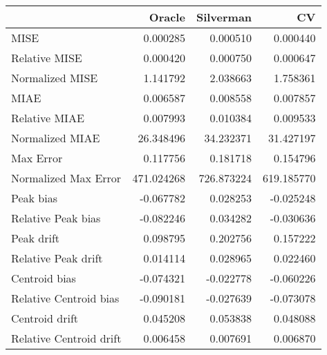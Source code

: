 \begin{tabular}{lrrr}
  \hline
 & Oracle & Silverman & CV \\ 
  \hline
MISE & 0.000285 & 0.000510 & 0.000440 \\ 
  Relative MISE & 0.000420 & 0.000750 & 0.000647 \\ 
  Normalized MISE & 1.141792 & 2.038663 & 1.758361 \\ 
  MIAE & 0.006587 & 0.008558 & 0.007857 \\ 
  Relative MIAE & 0.007993 & 0.010384 & 0.009533 \\ 
  Normalized MIAE & 26.348496 & 34.232371 & 31.427197 \\ 
  Max Error & 0.117756 & 0.181718 & 0.154796 \\ 
  Normalized Max Error & 471.024268 & 726.873224 & 619.185770 \\ 
  Peak bias & -0.067782 & 0.028253 & -0.025248 \\ 
  Relative Peak bias & -0.082246 & 0.034282 & -0.030636 \\ 
  Peak drift & 0.098795 & 0.202756 & 0.157222 \\ 
  Relative Peak drift & 0.014114 & 0.028965 & 0.022460 \\ 
  Centroid bias & -0.074321 & -0.022778 & -0.060226 \\ 
  Relative Centroid bias & -0.090181 & -0.027639 & -0.073078 \\ 
  Centroid drift & 0.045208 & 0.053838 & 0.048088 \\ 
  Relative Centroid drift & 0.006458 & 0.007691 & 0.006870 \\ 
   \hline
\end{tabular}
